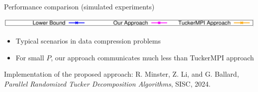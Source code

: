 \documentclass[aspectratio=169]{beamer}
\begin{document}
\begin{frame}{Performance comparison (simulated experiments)}
	\begin{center}
		\includegraphics[scale=0.15]{./simplified_label.jpeg}
	\end{center}
	\vfill
	
	\begin{itemize}
		\item Typical scenarios in data compression problems
		\item For small $P$, our approach communicates much less than TuckerMPI approach
	\end{itemize}
	\vfill
	\vspace*{0.15cm}
	{\footnotesize Implementation of the proposed approach:  R. Minster, Z. Li, and G. Ballard, \emph{Parallel Randomized Tucker Decomposition Algorithms}, SISC, 2024.}
	
\end{frame}
\end{document}
